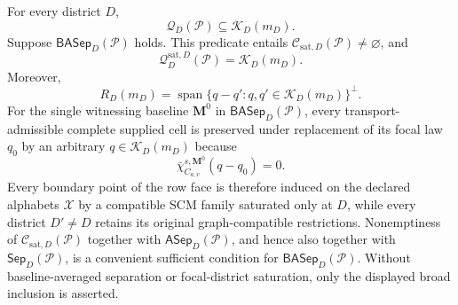 For every district \(D\),
\[
\mathcal Q_D(\mathcal P)\subseteq\mathcal K_D(m_D).
\]
Suppose \(\mathsf{BASep}_D(\mathcal P)\) holds.  This predicate entails \(\mathcal C_{\mathrm{sat},D}(\mathcal P)\ne\varnothing\), and
\[
\mathcal Q_D^{\mathrm{sat},D}(\mathcal P)=\mathcal K_D(m_D).
\]
Moreover,
\[
R_D(m_D)
=\operatorname{span}\{q-q':q,q'\in\mathcal K_D(m_D)\}^{\perp}.
\]
For the single witnessing baseline \(\mathbf M^0\) in \(\mathsf{BASep}_D(\mathcal P)\), every transport-admissible complete supplied cell is preserved under replacement of its focal law \(q_0\) by an arbitrary \(q\in\mathcal K_D(m_D)\) because
\[
\bar\chi_{C_{a,v}}^{s,\mathbf M^0}(q-q_0)=0.
\]
Every boundary point of the row face is therefore induced on the declared alphabets \(\mathcal X\) by a compatible SCM family saturated only at \(D\), while every district \(D'\ne D\) retains its original graph-compatible restrictions.  Nonemptiness of \(\mathcal C_{\mathrm{sat},D}(\mathcal P)\) together with \(\mathsf{ASep}_D(\mathcal P)\), and hence also together with \(\mathsf{Sep}_D(\mathcal P)\), is a convenient sufficient condition for \(\mathsf{BASep}_D(\mathcal P)\).  Without baseline-averaged separation or focal-district saturation, only the displayed broad inclusion is asserted.